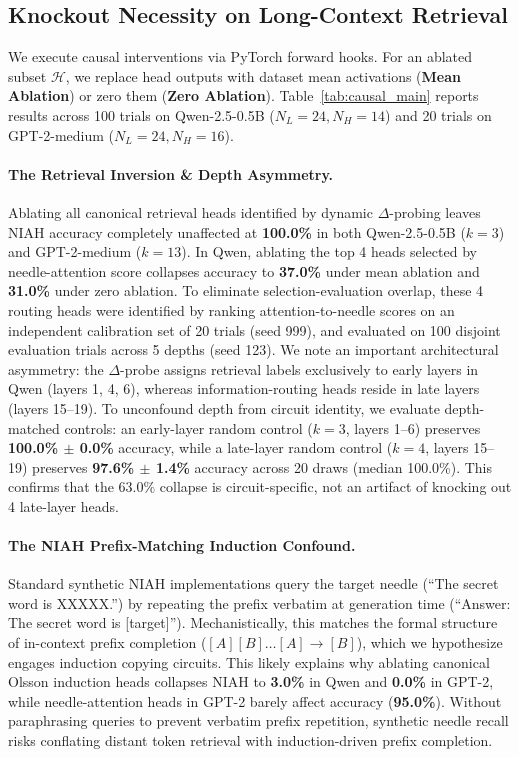 \documentclass[11pt]{article}
\begin{document}
\subsection{Knockout Necessity on Long-Context Retrieval}
We execute causal interventions via PyTorch forward hooks. For an ablated subset $\mathcal{H}$, we replace head outputs with dataset mean activations (\textbf{Mean Ablation}) or zero them (\textbf{Zero Ablation}). Table~\ref{tab:causal_main} reports results across 100 trials on Qwen-2.5-0.5B ($N_L = 24, N_H = 14$) and 20 trials on GPT-2-medium ($N_L = 24, N_H = 16$).

\paragraph{The Retrieval Inversion \& Depth Asymmetry.}
Ablating all canonical retrieval heads identified by dynamic $\Delta$-probing leaves NIAH accuracy completely unaffected at \textbf{100.0\%} in both Qwen-2.5-0.5B ($k=3$) and GPT-2-medium ($k=13$).
In Qwen, ablating the top 4 heads selected by needle-attention score collapses accuracy to \textbf{37.0\%} under mean ablation and \textbf{31.0\%} under zero ablation. 
To eliminate selection-evaluation overlap, these 4 routing heads were identified by ranking attention-to-needle scores on an independent calibration set of 20 trials (seed 999), and evaluated on 100 disjoint evaluation trials across 5 depths (seed 123).
We note an important architectural asymmetry: the $\Delta$-probe assigns retrieval labels exclusively to early layers in Qwen (layers 1, 4, 6), whereas information-routing heads reside in late layers (layers 15--19). 
To unconfound depth from circuit identity, we evaluate depth-matched controls: an early-layer random control ($k=3$, layers 1--6) preserves \textbf{100.0\% $\pm$ 0.0\%} accuracy, while a late-layer random control ($k=4$, layers 15--19) preserves \textbf{97.6\% $\pm$ 1.4\%} accuracy across 20 draws (median 100.0\%). This confirms that the $63.0\%$ collapse is circuit-specific, not an artifact of knocking out 4 late-layer heads.

\paragraph{The NIAH Prefix-Matching Induction Confound.}
Standard synthetic NIAH implementations query the target needle (``The secret word is XXXXX.'') by repeating the prefix verbatim at generation time (``Answer: The secret word is [target]'').
Mechanistically, this matches the formal structure of in-context prefix completion ($[A][B] \dots [A] \to [B]$), which we hypothesize engages induction copying circuits.
This likely explains why ablating canonical Olsson induction heads collapses NIAH to \textbf{3.0\%} in Qwen and \textbf{0.0\%} in GPT-2, while needle-attention heads in GPT-2 barely affect accuracy (\textbf{95.0\%}).
Without paraphrasing queries to prevent verbatim prefix repetition, synthetic needle recall risks conflating distant token retrieval with induction-driven prefix completion.
\end{document}
